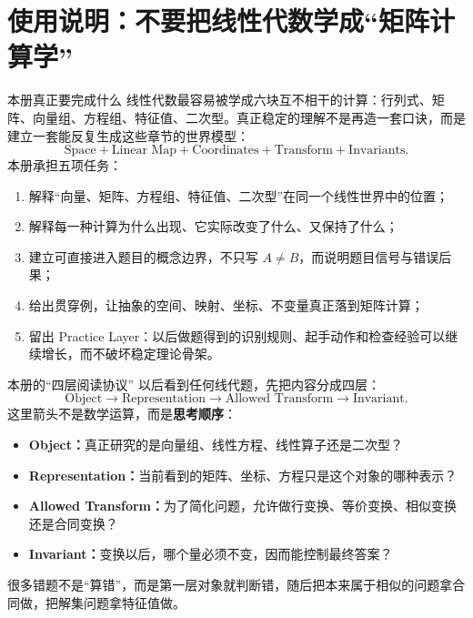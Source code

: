 \documentclass[11pt,a4paper,openany]{ctexbook}
\newcommand{\key}[1]{\textbf{\color{deep}#1}}
\begin{document}
\chapter*{使用说明：不要把线性代数学成“矩阵计算学”}

\begin{corebox}{本册真正要完成什么}
线性代数最容易被学成六块互不相干的计算：行列式、矩阵、向量组、方程组、特征值、二次型。真正稳定的理解不是再造一套口诀，而是建立一套能反复生成这些章节的世界模型：
\[
\boxed{\text{Space}+\text{Linear Map}+\text{Coordinates}+\text{Transform}+\text{Invariants}}.
\]
本册承担五项任务：
\begin{enumerate}
  \item 解释“向量、矩阵、方程组、特征值、二次型”在同一个线性世界中的位置；
  \item 解释每一种计算为什么出现、它实际改变了什么、又保持了什么；
  \item 建立可直接进入题目的概念边界，不只写 $A\neq B$，而说明题目信号与错误后果；
  \item 给出贯穿例，让抽象的空间、映射、坐标、不变量真正落到矩阵计算；
  \item 留出 Practice Layer：以后做题得到的识别规则、起手动作和检查经验可以继续增长，而不破坏稳定理论骨架。
\end{enumerate}
\end{corebox}

\begin{methodbox}{本册的“四层阅读协议”}
以后看到任何线代题，先把内容分成四层：
\[
\boxed{\text{Object}\rightarrow\text{Representation}\rightarrow\text{Allowed Transform}\rightarrow\text{Invariant}}.
\]
这里箭头不是数学运算，而是\key{思考顺序}：
\begin{itemize}
  \item \key{Object：}真正研究的是向量组、线性方程、线性算子还是二次型？
  \item \key{Representation：}当前看到的矩阵、坐标、方程只是这个对象的哪种表示？
  \item \key{Allowed Transform：}为了简化问题，允许做行变换、等价变换、相似变换还是合同变换？
  \item \key{Invariant：}变换以后，哪个量必须不变，因而能控制最终答案？
\end{itemize}
很多错题不是“算错”，而是第一层对象就判断错，随后把本来属于相似的问题拿合同做，把解集问题拿特征值做。
\end{methodbox}
\end{document}

